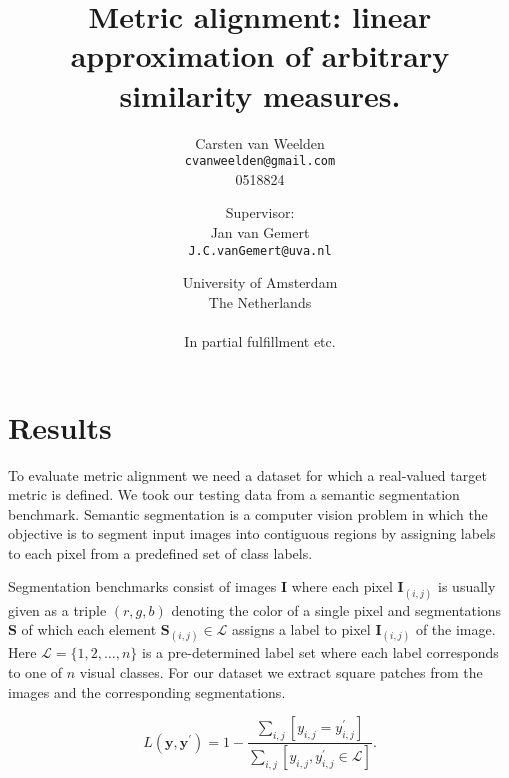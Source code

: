 \documentclass[a4paper,titlepage]{article}
\title{Metric alignment: linear approximation of arbitrary similarity measures.}
\author{Carsten van Weelden  \\ \texttt{cvanweelden@gmail.com} \\ 0518824 \and \small{Supervisor:} \\ Jan van Gemert \\ \texttt{J.C.vanGemert@uva.nl} \and University of Amsterdam\\
  The Netherlands \\ \\ In partial fulfillment etc.}
\renewcommand{\vec}[1]{\mathbf{#1}}
\newcommand{\mat}[1]{\mathbf{#1}}
\begin{document}
\maketitle

\begin{abstract}

\end{abstract}

\pagebreak

\tableofcontents

\pagebreak






\pagebreak



\pagebreak



%


\section{Results}

To evaluate metric alignment we need a dataset for which a real-valued target metric is defined. We took our testing data from a semantic segmentation benchmark. Semantic segmentation is a computer vision problem in which the objective is to segment input images into contiguous regions by assigning labels to each pixel from a predefined set of class labels. 


Segmentation benchmarks consist of images $\mat{I}$ where each pixel $\mat{I}_{(i,j)}$ is usually given as a triple $(r,g,b)$ denoting the color of a single pixel and segmentations $\mat{S}$ of which each element  $\mat{S}_{(i,j)} \in \mathcal{L}$ assigns a label to pixel $\mat{I}_{(i,j)}$ of the image. Here $\mathcal{L} = \{1, 2, \ldots, n\}$ is a pre-determined label set  where each label corresponds to one of $n$ visual classes. For our dataset we extract square patches from the images and the corresponding segmentations.


\begin{equation}
L(\vec{y}, \vec{y}^\prime) = 1 - \frac{\sum_{i,j} \left [ y_{i,j} = y^\prime_{i,j}\right]}{\sum_{i,j} \left [y_{i,j}, y^\prime_{i,j} \in \mathcal{L}\right ]}.
\label{eq:patch_loss}
\end{equation}
\end{document}
